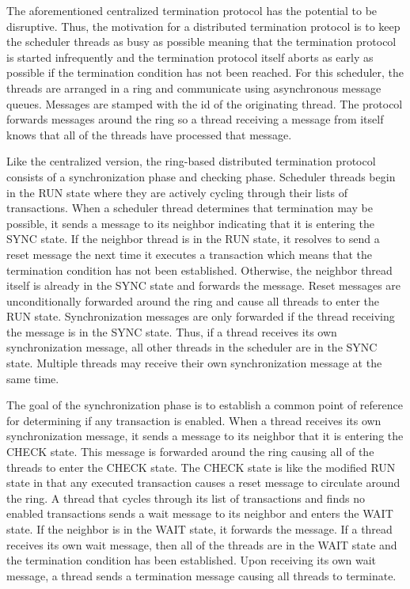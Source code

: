 The aforementioned centralized termination protocol has the potential to be disruptive.
Thus, the motivation for a distributed termination protocol is to keep the scheduler threads as busy as possible meaning that the termination protocol is started infrequently and the termination protocol itself aborts as early as possible if the termination condition has not been reached.
For this scheduler, the threads are arranged in a ring and communicate using asynchronous message queues.
Messages are stamped with the id of the originating thread.
The protocol forwards messages around the ring so a thread receiving a message from itself knows that all of the threads have processed that message.

Like the centralized version, the ring-based distributed termination protocol consists of a synchronization phase and checking phase.
Scheduler threads begin in the RUN state where they are actively cycling through their lists of transactions.
When a scheduler thread determines that termination may be possible, it sends a message to its neighbor indicating that it is entering the SYNC state.
If the neighbor thread is in the RUN state, it resolves to send a reset message the next time it executes a transaction which means that the termination condition has not been established.
Otherwise, the neighbor thread itself is already in the SYNC state and forwards the message.
Reset messages are unconditionally forwarded around the ring and cause all threads to enter the RUN state.
Synchronization messages are only forwarded if the thread receiving the message is in the SYNC state.
Thus, if a thread receives its own synchronization message, all other threads in the scheduler are in the SYNC state.
Multiple threads may receive their own synchronization message at the same time.

The goal of the synchronization phase is to establish a common point of reference for determining if any transaction is enabled.
When a thread receives its own synchronization message, it sends a message to its neighbor that it is entering the CHECK state.
This message is forwarded around the ring causing all of the threads to enter the CHECK state.
The CHECK state is like the modified RUN state in that any executed transaction causes a reset message to circulate around the ring.
A thread that cycles through its list of transactions and finds no enabled transactions sends a wait message to its neighbor and enters the WAIT state.
If the neighbor is in the WAIT state, it forwards the message.
If a thread receives its own wait message, then all of the threads are in the WAIT state and the termination condition has been established.
Upon receiving its own wait message, a thread sends a termination message causing all threads to terminate.

